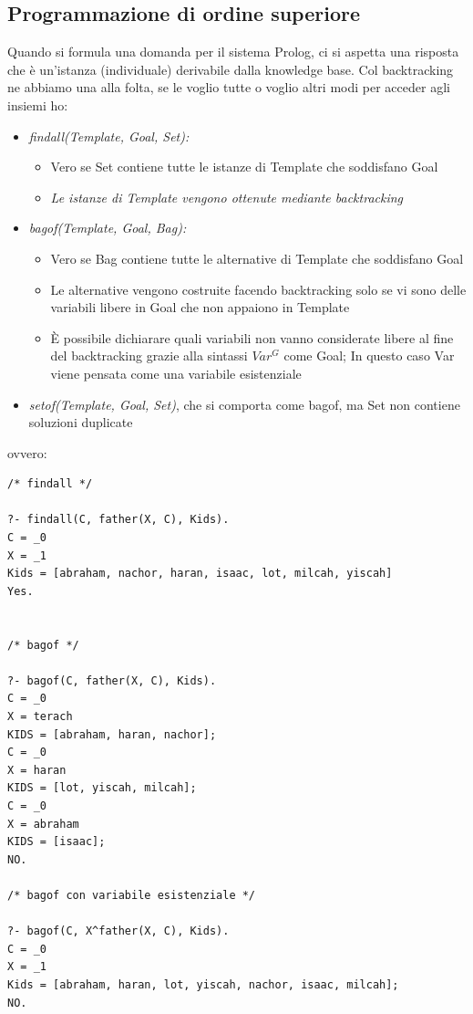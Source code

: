 \documentclass[a4paper]{report}
\begin{document}
\subsection{Programmazione di ordine superiore}
Quando si formula una domanda per il sistema Prolog, ci si
aspetta una risposta che è un'istanza (individuale) derivabile dalla knowledge base. Col backtracking ne abbiamo una alla folta, se le voglio tutte o voglio altri modi per acceder agli insiemi ho:
\begin{itemize}
\item \textit{findall(Template, Goal, Set):} 
\begin{itemize}
\item Vero se Set contiene tutte le istanze di Template che soddisfano Goal
\item \textit{Le istanze di Template vengono ottenute mediante backtracking}
\end{itemize}
\item \textit{bagof(Template, Goal, Bag):}
\begin{itemize}
\item Vero se Bag contiene tutte le alternative di Template che soddisfano Goal
\item Le alternative vengono costruite facendo backtracking solo se vi sono delle variabili libere in Goal che non appaiono in Template
\item È possibile dichiarare quali variabili non vanno considerate libere al fine del backtracking grazie alla sintassi $Var^G$ come Goal; In questo caso Var viene pensata come una variabile esistenziale
\end{itemize}
\item \textit{setof(Template, Goal, Set)}, che si comporta come bagof, ma Set non contiene soluzioni duplicate
\end{itemize}
\newpage
ovvero:
\begin{verbatim}
/* findall */

?- findall(C, father(X, C), Kids).
C = _0
X = _1
Kids = [abraham, nachor, haran, isaac, lot, milcah, yiscah]
Yes.


/* bagof */

?- bagof(C, father(X, C), Kids).
C = _0
X = terach
KIDS = [abraham, haran, nachor];
C = _0
X = haran
KIDS = [lot, yiscah, milcah];
C = _0
X = abraham
KIDS = [isaac];
NO.

/* bagof con variabile esistenziale */

?- bagof(C, X^father(X, C), Kids).
C = _0
X = _1
Kids = [abraham, haran, lot, yiscah, nachor, isaac, milcah];
NO.
\end{verbatim}
\end{document}
